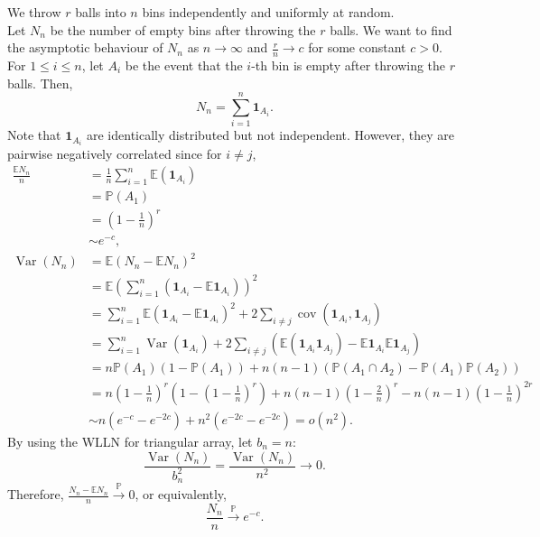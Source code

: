 \documentclass{huhtakm-template-book-v2}
\newcommand{\prob}{\mathbb{P}}
\newcommand{\expect}{\mathbb{E}}
\DeclareMathOperator{\Var}{Var}
\DeclareMathOperator{\cov}{cov}
\begin{document}
    \begin{eg}
        We throw $r$ balls into $n$ bins independently and uniformly at random.\\
        Let $N_{n}$ be the number of empty bins after throwing the $r$ balls. 
        We want to find the asymptotic behaviour of $N_{n}$ as $n \to \infty$ and $\frac{r}{n} \to c$ for some constant $c > 0$.\\
        For $1 \leq i \leq n$, let $A_{i}$ be the event that the $i$-th bin is empty after throwing the $r$ balls. Then,
        \begin{equation*}
            N_{n} = \sum_{i = 1}^{n}\mathbf{1}_{A_{i}}.
        \end{equation*}
        Note that $\mathbf{1}_{A_{i}}$ are identically distributed but not independent. However, they are pairwise negatively correlated since for $i \neq j$,
        \begin{align*}
            \frac{\expect{N_{n}}}{n} &= \frac{1}{n}\sum_{i = 1}^{n}\expect(\mathbf{1}_{A_{i}})\\
            &= \prob(A_{1})\\
            &= \left(1-\frac{1}{n}\right)^{r}\\
            &\sim e^{-c},\\
            \Var(N_{n}) &= \expect(N_{n}-\expect{N_{n}})^{2}\\
            &= \expect\left(\sum_{i = 1}^{n}(\mathbf{1}_{A_{i}}-\expect{\mathbf{1}_{A_{i}}})\right)^{2}\\
            &= \sum_{i = 1}^{n}\expect\left(\mathbf{1}_{A_{i}}-\expect{\mathbf{1}_{A_{i}}}\right)^{2}+2\sum_{i \neq j}\cov(\mathbf{1}_{A_{i}},\mathbf{1}_{A_{j}})\\
            &= \sum_{i = 1}^{n}\Var(\mathbf{1}_{A_{i}})+2\sum_{i \neq j}\left(\expect(\mathbf{1}_{A_{i}}\mathbf{1}_{A_{j}})-\expect{\mathbf{1}_{A_{i}}}\expect{\mathbf{1}_{A_{j}}}\right)\\
            &= n\prob(A_{1})(1-\prob(A_{1}))+n(n-1)(\prob(A_{1}\cap A_{2})-\prob(A_{1})\prob(A_{2}))\\
            &= n\left(1-\frac{1}{n}\right)^{r}\left(1-\left(1-\frac{1}{n}\right)^{r}\right)+n(n-1)\left(1-\frac{2}{n}\right)^{r}-n(n-1)\left(1-\frac{1}{n}\right)^{2r}\\
            &\sim n\left(e^{-c}-e^{-2c}\right)+n^{2}\left(e^{-2c}-e^{-2c}\right) = o(n^{2}).
        \end{align*}
        By using the WLLN for triangular array, let $b_{n} = n$:
        \begin{equation*}
            \frac{\Var(N_{n})}{b_{n}^{2}} = \frac{\Var(N_{n})}{n^{2}} \to 0.
        \end{equation*}
        Therefore, $\frac{N_{n}-\expect{N_{n}}}{n} \xrightarrow{\prob} 0$, or equivalently,
        \begin{equation*}
            \frac{N_{n}}{n} \xrightarrow{\prob} e^{-c}.
        \end{equation*}
    \end{eg}
    \newpage
\end{document}
